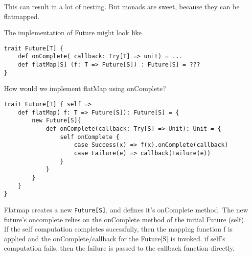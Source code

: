 This can result in a lot of nesting. But monads are sweet, because they can be flatmapped.

The implementation of Future might look like
\begin{lstlisting}
trait Future[T] {
	def onComplete( callback: Try[T] => unit) = ...
	def flatMap[S] (f: T => Future[S]) : Future[S] = ???
}
\end{lstlisting}
How would we implement flatMap using onComplete? 

\begin{lstlisting}
trait Future[T] { self => 
	def flatMap( f: T => Future[S]): Future[S] = { 
		new Future[S]{
			def onComplete(callback: Try[S] => Unit): Unit = {
				self onComplete {
					case Success(x) => f(x).onComplete(callback)
					case Failure(e) => callback(Failure(e))
				}
			}
		}
	}
}
\end{lstlisting}

Flatmap creates a new \lstinline|Future[S]|, and defines it's onComplete method. The new future's oncomplete relies on the onComplete method of the initial Future (self). If the self computation completes sucessfully, then the mapping function f is applied and the onComplete/callback for the Future[S] is invoked.
if self's computation fails, then the failure is passed to the callback function directly.



